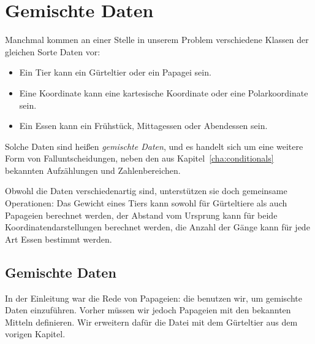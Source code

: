 
\chapter{Gemischte Daten}
\label{cha:gemischte-daten}

Manchmal kommen an einer Stelle in unserem Problem verschiedene
Klassen der gleichen Sorte Daten vor:
%
\begin{itemize}
\item Ein Tier kann ein Gürteltier oder ein Papagei sein.
\item Eine Koordinate kann eine kartesische Koordinate oder eine
  Polarkoordinate sein.
\item Ein Essen kann ein Frühstück, Mittagessen oder Abendessen sein.
\end{itemize}
%
Solche Daten sind heißen \textit{gemischte Daten}, und es handelt sich um eine weitere Form von
Falluntscheidungen, neben den aus Kapitel~\ref{cha:conditionals}
bekannten Aufzählungen und Zahlenbereichen.

Obwohl die Daten verschiedenartig sind, unterstützen sie doch
gemeinsame Operationen: Das Gewicht eines Tiers kann sowohl für
Gürteltiere als auch Papageien berechnet werden, der Abstand vom
Ursprung kann für beide Koordinatendarstellungen berechnet werden, die
Anzahl der Gänge kann für jede Art Essen bestimmt werden.

\section{Gemischte Daten}
\label{sec:mixed-data}

In der Einleitung war die Rede von Papageien: die benutzen wir, um
gemischte Daten einzuführen.  Vorher müssen wir jedoch Papageien mit den bekannten
Mitteln definieren.  Wir erweitern dafür die Datei mit dem Gürteltier
aus dem vorigen Kapitel.

